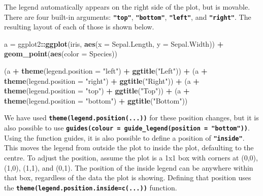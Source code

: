 \documentclass[
]{book}
\newenvironment{Shaded}{\begin{snugshade}}{\end{snugshade}}
\newcommand{\AttributeTok}[1]{\textcolor[rgb]{0.13,0.29,0.53}{#1}}
\newcommand{\FunctionTok}[1]{\textcolor[rgb]{0.13,0.29,0.53}{\textbf{#1}}}
\newcommand{\NormalTok}[1]{#1}
\newcommand{\OtherTok}[1]{\textcolor[rgb]{0.56,0.35,0.01}{#1}}
\newcommand{\SpecialCharTok}[1]{\textcolor[rgb]{0.81,0.36,0.00}{\textbf{#1}}}
\newcommand{\StringTok}[1]{\textcolor[rgb]{0.31,0.60,0.02}{#1}}
\begin{document}
The legend automatically appears on the right side of the plot, but is movable. There are four built-in arguments: \textbf{\texttt{"top"}}, \textbf{\texttt{"bottom"}}, \textbf{\texttt{"left"}}, and \textbf{\texttt{"right"}}. The resulting layout of each of those is shown below.

\begin{Shaded}
\begin{Highlighting}[]
\NormalTok{a }\OtherTok{=}\NormalTok{ ggplot2}\SpecialCharTok{::}\FunctionTok{ggplot}\NormalTok{(iris, }\FunctionTok{aes}\NormalTok{(}\AttributeTok{x =}\NormalTok{ Sepal.Length, }\AttributeTok{y =}\NormalTok{ Sepal.Width)) }\SpecialCharTok{+}
  \FunctionTok{geom\_point}\NormalTok{(}\FunctionTok{aes}\NormalTok{(}\AttributeTok{color =}\NormalTok{ Species))}

\NormalTok{(a }\SpecialCharTok{+} \FunctionTok{theme}\NormalTok{(}\AttributeTok{legend.position =} \StringTok{"left"}\NormalTok{) }\SpecialCharTok{+} \FunctionTok{ggtitle}\NormalTok{(}\StringTok{"Left"}\NormalTok{)) }\SpecialCharTok{+}
\NormalTok{  (a }\SpecialCharTok{+} \FunctionTok{theme}\NormalTok{(}\AttributeTok{legend.position =} \StringTok{"right"}\NormalTok{) }\SpecialCharTok{+} \FunctionTok{ggtitle}\NormalTok{(}\StringTok{"Right"}\NormalTok{)) }\SpecialCharTok{+}
\NormalTok{  (a }\SpecialCharTok{+} \FunctionTok{theme}\NormalTok{(}\AttributeTok{legend.position =} \StringTok{"top"}\NormalTok{) }\SpecialCharTok{+} \FunctionTok{ggtitle}\NormalTok{(}\StringTok{"Top"}\NormalTok{)) }\SpecialCharTok{+}
\NormalTok{  (a }\SpecialCharTok{+} \FunctionTok{theme}\NormalTok{(}\AttributeTok{legend.position =} \StringTok{"bottom"}\NormalTok{) }\SpecialCharTok{+} \FunctionTok{ggtitle}\NormalTok{(}\StringTok{"Bottom"}\NormalTok{)) }
\end{Highlighting}
\end{Shaded}

We have used \textbf{\texttt{theme(legend.position(...))}} for these position changes, but it is also possible to use \textbf{\texttt{guides(colour\ =\ guide\_legend(position\ =\ "bottom"))}}. Using the function guides, it is also possible to define a position of \textbf{\texttt{"inside"}}. This moves the legend from outside the plot to inside the plot, defaulting to the centre. To adjust the position, assume the plot is a 1x1 box with corners at (0,0), (1,0), (1,1), and (0,1). The position of the inside legend can be anywhere within that box, regardless of the data the plot is showing. Defining that position uses the \textbf{\texttt{theme(legend.position.inside=c(...))}} function.
\end{document}

